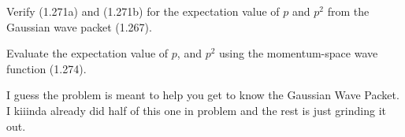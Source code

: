 \begin{question}
  \begin{questionpart}
    Verify (1.271a) and (1.271b) for the expectation value of $p$ and
    $p^2$ from the Gaussian wave packet (1.267).
  \end{questionpart}

  \begin{questionpart}
    Evaluate the expectation value of $p$, and $p^2$ using the
    momentum-space wave function (1.274).
  \end{questionpart}
\end{question}

\begin{purpose}
  I guess the problem is meant to help you get to know the Gaussian
  Wave Packet.  I kiiinda already did half of this one in problem
   and the rest is just grinding it out.
\end{purpose}

